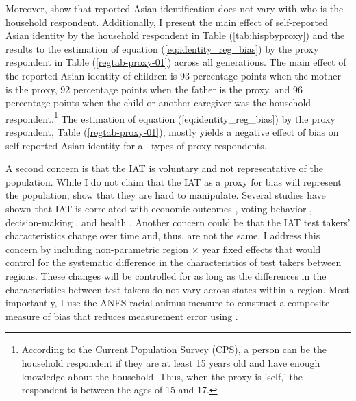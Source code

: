 Moreover, \textcite{duncanIntermarriageIntergenerationalTransmission2011} show that reported Asian identification does not vary with who is the household respondent. Additionally, I present the main effect of self-reported Asian identity by the household respondent in Table (\ref{tab:hispbyproxy}) and the results to the estimation of equation (\ref{eq:identity_reg_bias}) by the proxy respondent in Table (\ref{regtab-proxy-01}) across all generations. The main effect of the reported Asian identity of children is 93 percentage points when the mother is the proxy, 92 percentage points when the father is the proxy, and 96 percentage points when the child or another caregiver was the household respondent.\footnote{According to the Current Population Survey (CPS), a person can be the household respondent if they are at least 15 years old and have enough knowledge about the household. Thus, when the proxy is 'self,' the respondent is between the ages of 15 and 17.} The estimation of equation (\ref{eq:identity_reg_bias}) by the proxy respondent, Table (\ref{regtab-proxy-01}), mostly yields a negative effect of bias on self-reported Asian identity for all types of proxy respondents.

A second concern is that the IAT is voluntary and not representative of the population. While I do not claim that the IAT  as a proxy for bias will represent the population, \textcite{egloffPredictiveValidityImplicit2002} show that they are hard to manipulate. Several studies have shown that IAT is correlated with economic outcomes \autocite{chettyRaceEconomicOpportunity2020,gloverDiscriminationSelfFulfillingProphecy2017}, voting behavior \autocite{friesePredictingVotingBehavior2007}, decision-making \autocite{bertrandImplicitDiscrimination2005,carlanaImplicitStereotypesEvidence2019}, and health \autocite{leitnerRacialBiasAssociated2016}. Another concern could be that the IAT test takers' characteristics change over time and, thus, are not the same. I address this concern by including non-parametric region $\times$ year fixed effects that would control for the systematic difference in the characteristics of test takers between regions. These changes will be controlled for as long as the differences in the characteristics between test takers do not vary across states within a region. Most importantly, I use the ANES racial animus measure to construct a composite measure of bias that reduces measurement error using \textcite{lubotskyInterpretationRegressionsMultiple2006}.

